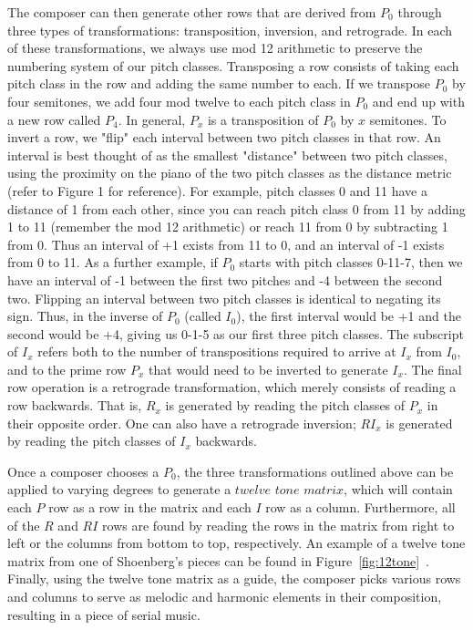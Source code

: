 The composer can then generate other rows that are derived from $P_0$ through three types of transformations:
transposition, inversion, and retrograde. In each of these transformations, we always use mod 12 arithmetic to preserve the 
numbering system of our pitch classes. Transposing a row consists of taking each pitch class in the row and adding the same number 
to each. If we transpose $P_0$ by four semitones, we add four mod twelve to each pitch class in $P_0$ and end up with a new row 
called $P_4$. In general, $P_x$ is a transposition of $P_0$ by $x$ semitones. To invert a row, we "flip" each interval between two 
pitch classes in that row. An interval is best thought of as the smallest "distance" between two pitch classes, using the proximity
on the piano of the two pitch classes as the distance metric (refer to Figure 1 for reference). 
For example, pitch classes 0 and 11 have a distance of 1 from each other,
since you can reach pitch class 0 from 11 by adding 1 to 11 (remember the mod 12 arithmetic) or reach 11 from 0 by subtracting 1
from 0. Thus an interval of +1 exists from 11 to 0, and an interval of -1 exists from 0 to 11.
As a further example, if $P_0$ starts with pitch classes 0-11-7, then we have an interval of -1 between the first two 
pitches and -4  between the second two. Flipping an interval between two pitch classes is identical to
negating its sign.
Thus, in the inverse of $P_0$ (called $I_0$), the first interval would be +1 and the second would 
be +4, giving us 0-1-5 as our first three pitch classes.  The subscript of $I_x$  refers both to the number of transpositions required 
to arrive at $I_x$ from $I_0$, and to the prime row $P_x$ that would need to be inverted to generate $I_x$. The final row 
operation is a retrograde transformation, which merely consists of reading a row backwards. That is, $R_x$ is generated by reading 
the pitch classes of $P_x$ in their opposite order. One can also have a retrograde inversion; $RI_x$ is generated by reading the 
pitch classes of $I_x$ backwards.

Once a composer chooses a $P_0$, the three transformations outlined above can be applied to varying degrees to generate a $twelve$ $tone$ $matrix$, which will contain each $P$ row as a row in the matrix and each $I$ row as a column.
Furthermore, all of the $R$ and $RI$ rows are found by reading the rows in the matrix from right to left or the columns 
from bottom to top, respectively. An example of a 
twelve tone matrix from one of Shoenberg's pieces can be found in Figure~\ref{fig:12tone}~\cite{devoto2013twelve}. Finally, using the twelve tone matrix as a guide,
	   the composer picks various rows and columns to serve as melodic and harmonic elements in their composition, resulting in a piece
	   of serial music.

